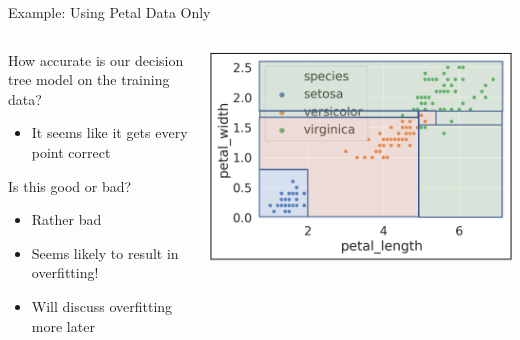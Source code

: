 \documentclass[aspectratio=169]{../latex_main/tntbeamer}  %
\begin{document}
	 
	 \begin{frame}{Example: Using Petal Data Only}
	   \begin{columns}
	        \begin{column}{.5\textwidth}
	        
	               How accurate is our decision tree model on the training data?\\
	               \begin{itemize}
	                   \item It seems like it gets every point correct
	               \end{itemize}
	               \bigskip
	                Is this good or bad?
	                \begin{itemize}
	                    \item Rather bad
	                    \item Seems likely to result in overfitting!
	                    \item Will discuss overfitting more later
	                \end{itemize}
	                
	        \end{column}
	   
	   
	         \begin{column}{.5\textwidth}

	                     \includegraphics[scale=.34]{figure_tree/Bild16}
	                     
	        \end{column}
	   \end{columns}
	 \end{frame}
\end{document}

